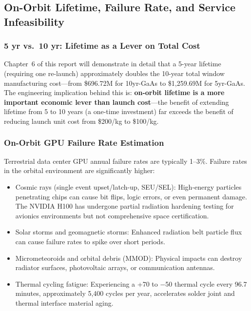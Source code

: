 \subsection{On-Orbit Lifetime, Failure Rate, and Service Infeasibility}

\subsubsection{5 yr vs.\ 10 yr: Lifetime as a Lever on Total Cost}

Chapter~6 of this report will demonstrate in detail that a 5-year lifetime (requiring one re-launch) approximately doubles the 10-year total window manufacturing cost---from \$696.72M for 10yr-GaAs to \$1,259.69M for 5yr-GaAs. The engineering implication behind this is: \textbf{on-orbit lifetime is a more important economic lever than launch cost}---the benefit of extending lifetime from 5 to 10 years (a one-time investment) far exceeds the benefit of reducing launch unit cost from \$200/kg to \$100/kg.

\subsubsection{On-Orbit GPU Failure Rate Estimation}

Terrestrial data center GPU annual failure rates are typically 1--3\%. Failure rates in the orbital environment are significantly higher:

\begin{itemize}[leftmargin=*]
    \item Cosmic rays (single event upset/latch-up, SEU/SEL): High-energy particles penetrating chips can cause bit flips, logic errors, or even permanent damage. The NVIDIA H100 has undergone partial radiation hardening testing for avionics environments but not comprehensive space certification\cite{newspace2025h100}.
    \item Solar storms and geomagnetic storms: Enhanced radiation belt particle flux can cause failure rates to spike over short periods.
    \item Micrometeoroids and orbital debris (MMOD): Physical impacts can destroy radiator surfaces, photovoltaic arrays, or communication antennas.
    \item Thermal cycling fatigue: Experiencing a +70\unitC{} to $-$50\unitC{} thermal cycle every 96.7 minutes, approximately 5,400 cycles per year, accelerates solder joint and thermal interface material aging.
\end{itemize}

